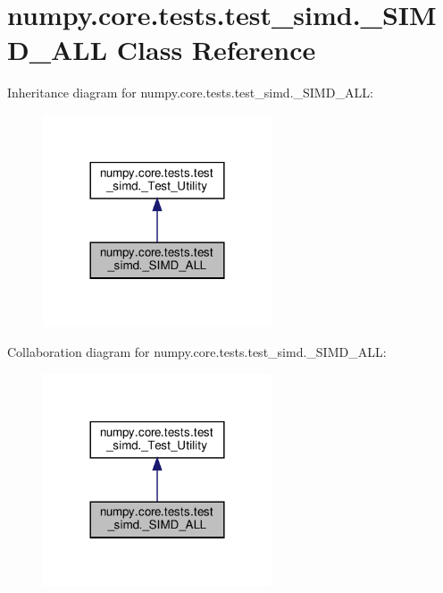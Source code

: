 \hypertarget{classnumpy_1_1core_1_1tests_1_1test__simd_1_1__SIMD__ALL}{}\section{numpy.\+core.\+tests.\+test\+\_\+simd.\+\_\+\+S\+I\+M\+D\+\_\+\+A\+LL Class Reference}
\label{classnumpy_1_1core_1_1tests_1_1test__simd_1_1__SIMD__ALL}


Inheritance diagram for numpy.\+core.\+tests.\+test\+\_\+simd.\+\_\+\+S\+I\+M\+D\+\_\+\+A\+LL\+:
\nopagebreak
\begin{figure}[H]
\begin{center}
\leavevmode
\includegraphics[width=192pt]{classnumpy_1_1core_1_1tests_1_1test__simd_1_1__SIMD__ALL__inherit__graph}
\end{center}
\end{figure}


Collaboration diagram for numpy.\+core.\+tests.\+test\+\_\+simd.\+\_\+\+S\+I\+M\+D\+\_\+\+A\+LL\+:
\nopagebreak
\begin{figure}[H]
\begin{center}
\leavevmode
\includegraphics[width=192pt]{classnumpy_1_1core_1_1tests_1_1test__simd_1_1__SIMD__ALL__coll__graph}
\end{center}
\end{figure}
